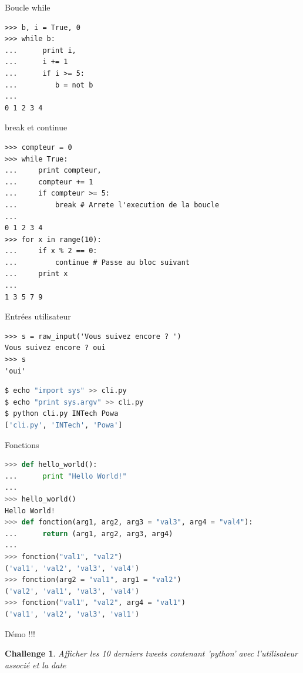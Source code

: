 \documentclass{beamer}
\begin{document}
\begin{frame}[fragile]{Boucle while}
\begin{lstlisting}
>>> b, i = True, 0
>>> while b:
...      print i,
...      i += 1
...      if i >= 5:
...         b = not b
... 
0 1 2 3 4
\end{lstlisting}
\end{frame}

\begin{frame}[fragile]{break et continue}
\begin{lstlisting}
>>> compteur = 0
>>> while True:
...     print compteur,
...     compteur += 1
...     if compteur >= 5:
...         break # Arrete l'execution de la boucle
...
0 1 2 3 4
>>> for x in range(10):
...     if x % 2 == 0:
...         continue # Passe au bloc suivant
...     print x
...
1 3 5 7 9
\end{lstlisting}
\end{frame}

\begin{frame}[fragile]{Entrées utilisateur}
\begin{lstlisting}
>>> s = raw_input('Vous suivez encore ? ')
Vous suivez encore ? oui
>>> s
'oui'
\end{lstlisting}

\begin{lstlisting}[language=bash]
$ echo "import sys" >> cli.py
$ echo "print sys.argv" >> cli.py
$ python cli.py INTech Powa
['cli.py', 'INTech', 'Powa']
\end{lstlisting}
\end{frame}

\begin{frame}[fragile]{Fonctions}
\begin{lstlisting}[language=python]
>>> def hello_world():
...      print "Hello World!"
... 
>>> hello_world()
Hello World!
>>> def fonction(arg1, arg2, arg3 = "val3", arg4 = "val4"):
...      return (arg1, arg2, arg3, arg4)
... 
>>> fonction("val1", "val2")
('val1', 'val2', 'val3', 'val4')
>>> fonction(arg2 = "val1", arg1 = "val2")
('val2', 'val1', 'val3', 'val4')
>>> fonction("val1", "val2", arg4 = "val1")
('val1', 'val2', 'val3', 'val1')
\end{lstlisting}
\end{frame}

\newtheorem{challenge}{Challenge}
\begin{frame}[fragile]{Démo !!!}
\begin{challenge}
Afficher les 10 derniers tweets contenant 'python' avec l'utilisateur associé et la date
\end{challenge}
\end{frame}
\end{document}
